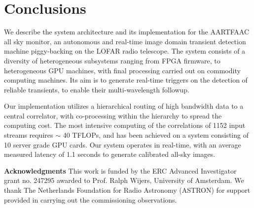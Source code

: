 \documentclass{ws-jai}
\begin{document}

\section {\label{sec:conclusion} Conclusions}
We describe the system architecture and  its implementation for the AARTFAAC all
sky  monitor,  an autonomous  and  real-time  image domain  transient  detection
machine piggy-backing  on the LOFAR radio  telescope.  The system consists  of a
diversity   of  heterogeneous   subsystems  ranging   from  FPGA   firmware,  to
heterogeneous  GPU machines,  with  final processing  carried  out on  commodity
computing machines.  Its aim is to  generate real-time triggers on the detection
of reliable transients, to enable their multi-wavelength followup.

Our implementation utilizes  a hierarchical routing of high bandwidth  data to a
central  correlator,  with co-processing  within  the  hierarchy to  spread  the
computing cost.  The most intensive computing  of the correlations of 1152 input
streams requires $\sim$ 40 TFLOPs, and  has been achieved on a system consisting
of 10 server grade GPU cards.  Our system operates in real-time, with an average
measured  latency of  1.1 seconds  to  generate calibrated  all-sky images.



\noindent  \textbf{Acknowledgments} This  work  is funded  by  the ERC  Advanced
Investigator  grant no.  247295 awarded  to Prof.   Ralph Wijers,  University of
Amsterdam.  We thank The Netherlands Foundation for Radio Astronomy (ASTRON) for
support provided in carrying out the commissioning observations.



\end{document}
